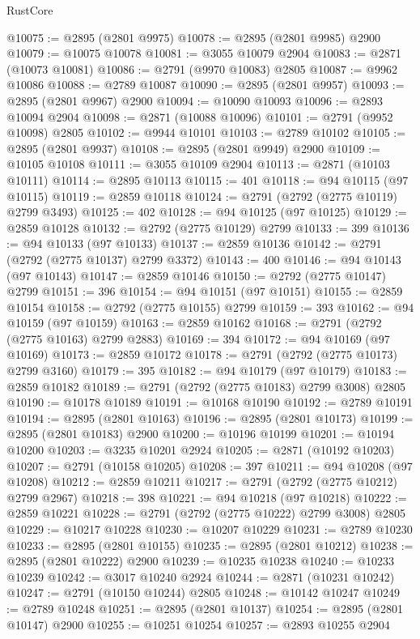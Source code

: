 \begin{lexlean}{RustCore}
\begin{coremodule}
@10075 := @2895 (@2801 @9975)
@10078 := @2895 (@2801 @9985) @2900
@10079 := @10075 @10078
@10081 := @3055 @10079 @2904
@10083 := @2871 (@10073 @10081)
@10086 := @2791 (@9970 @10083) @2805
@10087 := @9962 @10086
@10088 := @2789 @10087
@10090 := @2895 (@2801 @9957)
@10093 := @2895 (@2801 @9967) @2900
@10094 := @10090 @10093
@10096 := @2893 @10094 @2904
@10098 := @2871 (@10088 @10096)
@10101 := @2791 (@9952 @10098) @2805
@10102 := @9944 @10101
@10103 := @2789 @10102
@10105 := @2895 (@2801 @9937)
@10108 := @2895 (@2801 @9949) @2900
@10109 := @10105 @10108
@10111 := @3055 @10109 @2904
@10113 := @2871 (@10103 @10111)
@10114 := @2895 @10113
@10115 := 401
@10118 := @94 @10115 (@97 @10115)
@10119 := @2859 @10118
@10124 := @2791 (@2792 (@2775 @10119) @2799 @3493)
@10125 := 402
@10128 := @94 @10125 (@97 @10125)
@10129 := @2859 @10128
@10132 := @2792 (@2775 @10129) @2799
@10133 := 399
@10136 := @94 @10133 (@97 @10133)
@10137 := @2859 @10136
@10142 := @2791 (@2792 (@2775 @10137) @2799 @3372)
@10143 := 400
@10146 := @94 @10143 (@97 @10143)
@10147 := @2859 @10146
@10150 := @2792 (@2775 @10147) @2799
@10151 := 396
@10154 := @94 @10151 (@97 @10151)
@10155 := @2859 @10154
@10158 := @2792 (@2775 @10155) @2799
@10159 := 393
@10162 := @94 @10159 (@97 @10159)
@10163 := @2859 @10162
@10168 := @2791 (@2792 (@2775 @10163) @2799 @2883)
@10169 := 394
@10172 := @94 @10169 (@97 @10169)
@10173 := @2859 @10172
@10178 := @2791 (@2792 (@2775 @10173) @2799 @3160)
@10179 := 395
@10182 := @94 @10179 (@97 @10179)
@10183 := @2859 @10182
@10189 := @2791 (@2792 (@2775 @10183) @2799 @3008) @2805
@10190 := @10178 @10189
@10191 := @10168 @10190
@10192 := @2789 @10191
@10194 := @2895 (@2801 @10163)
@10196 := @2895 (@2801 @10173)
@10199 := @2895 (@2801 @10183) @2900
@10200 := @10196 @10199
@10201 := @10194 @10200
@10203 := @3235 @10201 @2924
@10205 := @2871 (@10192 @10203)
@10207 := @2791 (@10158 @10205)
@10208 := 397
@10211 := @94 @10208 (@97 @10208)
@10212 := @2859 @10211
@10217 := @2791 (@2792 (@2775 @10212) @2799 @2967)
@10218 := 398
@10221 := @94 @10218 (@97 @10218)
@10222 := @2859 @10221
@10228 := @2791 (@2792 (@2775 @10222) @2799 @3008) @2805
@10229 := @10217 @10228
@10230 := @10207 @10229
@10231 := @2789 @10230
@10233 := @2895 (@2801 @10155)
@10235 := @2895 (@2801 @10212)
@10238 := @2895 (@2801 @10222) @2900
@10239 := @10235 @10238
@10240 := @10233 @10239
@10242 := @3017 @10240 @2924
@10244 := @2871 (@10231 @10242)
@10247 := @2791 (@10150 @10244) @2805
@10248 := @10142 @10247
@10249 := @2789 @10248
@10251 := @2895 (@2801 @10137)
@10254 := @2895 (@2801 @10147) @2900
@10255 := @10251 @10254
@10257 := @2893 @10255 @2904

\end{coremodule}
\end{lexlean}
